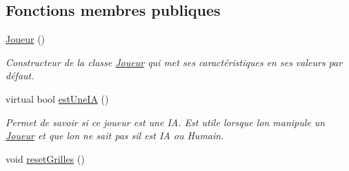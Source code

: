 \subsection*{Fonctions membres publiques}
\begin{DoxyCompactItemize}
\item 
\hyperlink{class_joueur_a951f6cb508b2d681eac4be586b8aac5f}{Joueur} ()\hypertarget{class_joueur_a951f6cb508b2d681eac4be586b8aac5f}{}\label{class_joueur_a951f6cb508b2d681eac4be586b8aac5f}

\begin{DoxyCompactList}\small\item\em Constructeur de la classe \hyperlink{class_joueur}{Joueur} qui met ses caractéristiques en ses valeurs par défaut. \end{DoxyCompactList}\item 
virtual bool \hyperlink{class_joueur_aee337662730df358b20474cac70d83e6}{est\+Une\+IA} ()
\begin{DoxyCompactList}\small\item\em Permet de savoir si ce joueur est une IA. Est utile lorsque l\textquotesingle{}on manipule un \hyperlink{class_joueur}{Joueur} et que l\textquotesingle{}on ne sait pas s\textquotesingle{}il est IA ou Humain. \end{DoxyCompactList}\item 
void \hyperlink{class_joueur_a07c1eba4f8531d594380fbcaaab240f6}{reset\+Grilles} ()\hypertarget{class_joueur_a07c1eba4f8531d594380fbcaaab240f6}{}\label{class_joueur_a07c1eba4f8531d594380fbcaaab240f6}


\end{DoxyCompactItemize}
